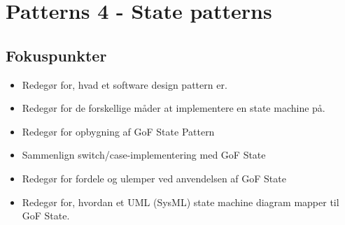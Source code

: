 \section{Patterns 4 - State patterns}

\subsection{Fokuspunkter}

\begin{itemize}
	\item Redegør for, hvad et software design pattern er.
	\item Redegør for de forskellige måder at implementere en state machine på.
	\item Redegør for opbygning af GoF State Pattern
	\item Sammenlign  switch/case-implementering med GoF State
	\item Redegør for fordele og ulemper ved anvendelsen af GoF State
	\item Redegør for, hvordan et UML (SysML) state machine diagram mapper til GoF State.
\end{itemize}

